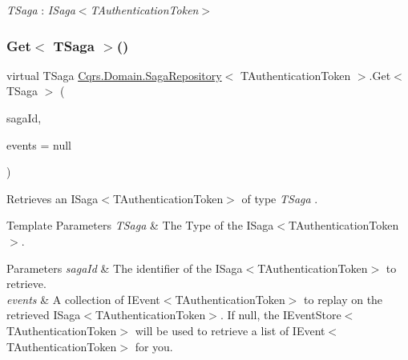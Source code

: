 \begin{Desc}
\item[Type Constraints]\begin{description}
\item[{\em T\+Saga} : {\em I\+Saga$<$T\+Authentication\+Token$>$}]\end{description}
\end{Desc}
\mbox{\label{classCqrs_1_1Domain_1_1SagaRepository_a1b80ecc2a5719d1681ca5d182a252120_a1b80ecc2a5719d1681ca5d182a252120}} 
\subsubsection{\texorpdfstring{Get$<$ T\+Saga $>$()}{Get< TSaga >()}}
{\footnotesize\ttfamily virtual T\+Saga \hyperlink{classCqrs_1_1Domain_1_1SagaRepository}{Cqrs.\+Domain.\+Saga\+Repository}$<$ T\+Authentication\+Token $>$.Get$<$ T\+Saga $>$ (\begin{DoxyParamCaption}\item[{Guid}]{saga\+Id,  }\item[{I\+List$<$ \hyperlink{interfaceCqrs_1_1Events_1_1ISagaEvent}{I\+Saga\+Event}$<$ T\+Authentication\+Token $>$$>$}]{events = {\ttfamily null} }\end{DoxyParamCaption})\hspace{0.3cm}{\ttfamily [virtual]}}



Retrieves an I\+Saga$<$\+T\+Authentication\+Token$>$ of type {\itshape T\+Saga} . 


\begin{DoxyTemplParams}{Template Parameters}
{\em T\+Saga} & The Type of the I\+Saga$<$\+T\+Authentication\+Token$>$.\\
\hline
\end{DoxyTemplParams}

\begin{DoxyParams}{Parameters}
{\em saga\+Id} & The identifier of the I\+Saga$<$\+T\+Authentication\+Token$>$ to retrieve.\\
\hline
{\em events} & A collection of I\+Event$<$\+T\+Authentication\+Token$>$ to replay on the retrieved I\+Saga$<$\+T\+Authentication\+Token$>$. If null, the I\+Event\+Store$<$\+T\+Authentication\+Token$>$ will be used to retrieve a list of I\+Event$<$\+T\+Authentication\+Token$>$ for you. \\
\hline
\end{DoxyParams}


